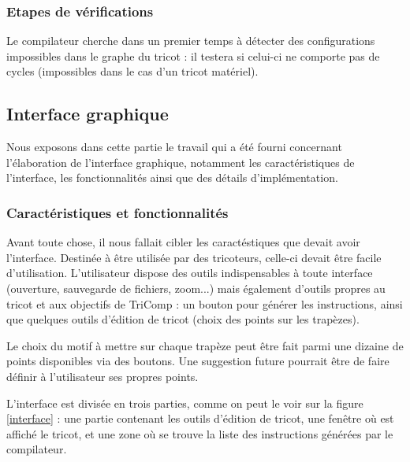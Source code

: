 \documentclass{article}
\begin{document}
\subsubsection{Etapes de vérifications}

Le compilateur cherche dans un premier temps à détecter des configurations 
impossibles dans le graphe du tricot : il testera si celui-ci ne comporte pas de cycles 
(impossibles dans le cas d'un tricot matériel).

\subsection{Interface graphique}

Nous exposons dans cette partie le travail qui a été fourni concernant
l'élaboration de l'interface graphique, notamment les caractéristiques
de l'interface, les fonctionnalités ainsi que des détails
d'implémentation.

\subsubsection{Caractéristiques et fonctionnalités}

Avant toute chose, il nous fallait cibler les caractéstiques que
devait avoir l'interface. Destinée à être utilisée par des tricoteurs,
celle-ci devait être facile d'utilisation. L'utilisateur dispose des
outils indispensables à toute interface (ouverture, sauvegarde de
fichiers, zoom...) mais également d'outils propres au tricot et aux
objectifs de TriComp : un bouton pour générer les instructions, ainsi
que quelques outils d'édition de tricot (choix des points sur les
trapèzes).

Le choix du motif à mettre sur chaque trapèze peut être fait parmi une
dizaine de points disponibles via des boutons. Une suggestion future
pourrait être de faire définir à l'utilisateur ses propres points.

L'interface est divisée en trois parties, comme on peut le voir sur la 
figure \ref{interface} : une partie contenant les
outils d'édition de tricot, une fenêtre où est affiché le tricot, et
une zone où se trouve la liste des instructions générées par le
compilateur.
\end{document}
